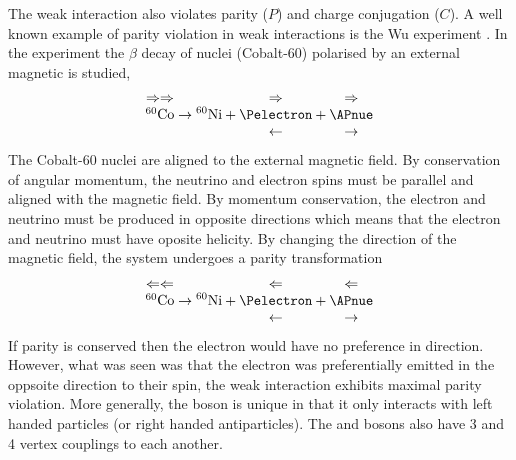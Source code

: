 The weak interaction also violates parity ($P$) and charge conjugation ($C$). A
well known example of parity violation in weak interactions is the Wu experiment
\cite{wu}. In the experiment the $\beta$ decay of nuclei (Cobalt-60) polarised by an
external magnetic is studied, 
\begin{equation}
\begin{matrix}
\Rightarrow\Rightarrow \\
^{60}\mathrm{Co} \\
~   
\end{matrix}
\to
{^{60}\mathrm{Ni}}
+
\begin{matrix}
\Rightarrow \\
\Pelectron \\
\leftarrow 
\end{matrix}
+
\begin{matrix}
\Rightarrow \\
\APnue \\
\rightarrow 
\end{matrix}
\end{equation}
The Cobalt-60 nuclei are aligned to the external magnetic field. By conservation
of angular momentum, the neutrino and electron spins must be parallel and
aligned with the magnetic field. By
momentum conservation, the electron and neutrino must be produced in opposite
directions which means that the electron and neutrino must have oposite helicity. 
By changing the direction of the magnetic field, the system undergoes a parity
transformation
\begin{equation}
\begin{matrix}
\Leftarrow\Leftarrow \\
^{60}\mathrm{Co} \\
~   
\end{matrix}
\to
{^{60}\mathrm{Ni}}
+
\begin{matrix}
\Leftarrow \\
\Pelectron \\
\leftarrow 
\end{matrix}
+
\begin{matrix}
\Leftarrow \\
\APnue \\
\rightarrow 
\end{matrix}
\end{equation}
If parity is conserved then the electron would have no preference in direction.
However, what was seen was that the electron was preferentially emitted in the
oppsoite direction to their spin, the weak interaction exhibits maximal parity
violation.
More generally, the \PWpm boson is unique in that it only interacts with left handed
particles (or right handed antiparticles).
The \PW and \PZ bosons also have 3 and 4 vertex couplings to each
another.

